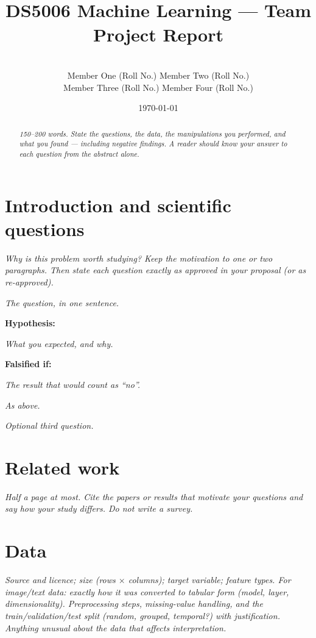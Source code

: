 \documentclass[11pt,a4paper]{article}
\title{\textbf{\projecttitle}\\[4pt]\large DS5006 Machine Learning --- Team Project Report}
\author{\teamname\\[2pt]
\small Member One (Roll No.) \quad Member Two (Roll No.)\\
\small Member Three (Roll No.) \quad Member Four (Roll No.)}
\date{\today}
\newcommand{\guide}[1]{{\color{gray!85!black}\small\itshape #1\par}}
\begin{document}
\maketitle

\begin{abstract}
\guide{150--200 words. State the questions, the data, the manipulations you performed, and what you found --- including negative findings. A reader should know your answer to each question from the abstract alone.}
\end{abstract}

\section{Introduction and scientific questions}
\guide{Why is this problem worth studying? Keep the motivation to one or two paragraphs. Then state each question exactly as approved in your proposal (or as re-approved).}

\begin{description}[leftmargin=1.2em,style=nextline]
\item[Q1.] \guide{The question, in one sentence.}
  \textbf{Hypothesis:} \guide{What you expected, and why.}
  \textbf{Falsified if:} \guide{The result that would count as ``no''.}
\item[Q2.] \guide{As above.}
\item[Q3.] \guide{Optional third question.}
\end{description}

\section{Related work}
\guide{Half a page at most. Cite the papers or results that motivate your questions and say how your study differs. Do not write a survey.}

\section{Data}
\guide{Source and licence; size (rows $\times$ columns); target variable; feature types. For image/text data: exactly how it was converted to tabular form (model, layer, dimensionality). Preprocessing steps, missing-value handling, and the train/validation/test split (random, grouped, temporal?) with justification. Anything unusual about the data that affects interpretation.}
\end{document}
